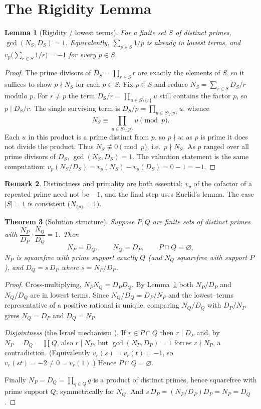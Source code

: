 \documentclass[11pt]{article}
\newtheorem{theorem}{Theorem}[section]
\newtheorem{lemma}[theorem]{Lemma}
\theoremstyle{definition}
\newtheorem{remark}[theorem]{Remark}
\begin{document}
\section{The Rigidity Lemma}\label{sec:rigidity}

\begin{lemma}[Rigidity / lowest terms]\label{thm:rigidity}
For a finite set $S$ of distinct primes, $\gcd(N_S,D_S)=1$. Equivalently, $\sum_{p\in S}1/p$ is
already in lowest terms, and $v_p\!\bigl(\sum_{r\in S}1/r\bigr)=-1$ for every $p\in S$.
\end{lemma}

\begin{proof}
The prime divisors of $D_S=\prod_{r\in S}r$ are exactly the elements of $S$, so it suffices to show
$p\nmid N_S$ for each $p\in S$. Fix $p\in S$ and reduce $N_S=\sum_{r\in S}D_S/r$ modulo $p$. For
$r\ne p$ the term $D_S/r=\prod_{u\in S\setminus\{r\}}u$ still contains the factor $p$, so
$p\mid D_S/r$. The single surviving term is $D_S/p=\prod_{u\in S\setminus\{p\}}u$, whence
\[
N_S \equiv \prod_{u\in S\setminus\{p\}} u \pmod p.
\]
Each $u$ in this product is a prime distinct from $p$, so $p\nmid u$; as $p$ is prime it does not
divide the product. Thus $N_S\not\equiv0\pmod p$, i.e.\ $p\nmid N_S$. As $p$ ranged over all prime
divisors of $D_S$, $\gcd(N_S,D_S)=1$. The valuation statement is the same computation:
$v_p(N_S/D_S)=v_p(N_S)-v_p(D_S)=0-1=-1$.
\end{proof}

\begin{remark}
Distinctness and primality are both essential: $v_p$ of the cofactor of a repeated prime need not be
$-1$, and the final step uses Euclid's lemma. The case $|S|=1$ is consistent ($N_{\{p\}}=1$).
\end{remark}

\begin{theorem}[Solution structure]\label{thm:structure}
Suppose $P,Q$ are finite sets of distinct primes with $\dfrac{N_P}{D_P}\cdot\dfrac{N_Q}{D_Q}=1$.
Then
\[
N_P=D_Q,\qquad N_Q=D_P,\qquad P\cap Q=\varnothing,
\]
$N_P$ is squarefree with prime support exactly $Q$ (and $N_Q$ squarefree with support $P$), and
$D_Q=s\,D_P$ where $s=N_P/D_P$.
\end{theorem}

\begin{proof}
Cross-multiplying, $N_PN_Q=D_PD_Q$. By Lemma~\ref{thm:rigidity} both $N_P/D_P$ and $N_Q/D_Q$ are in
lowest terms. Since $N_Q/D_Q=D_P/N_P$ and the lowest--terms representative of a positive rational is
unique, comparing $N_Q/D_Q$ with $D_P/N_P$ gives $N_Q=D_P$ and $D_Q=N_P$.

\emph{Disjointness} (the Israel mechanism \cite{MO320838}). If $r\in P\cap Q$ then $r\mid D_P$ and,
by $N_P=D_Q=\prod Q$, also $r\mid N_P$, but $\gcd(N_P,D_P)=1$ forces $r\nmid N_P$, a contradiction.
(Equivalently $v_r(s)=v_r(t)=-1$, so $v_r(st)=-2\neq0=v_r(1)$.) Hence $P\cap Q=\varnothing$.

Finally $N_P=D_Q=\prod_{q\in Q}q$ is a product of distinct primes, hence squarefree with prime
support $Q$; symmetrically for $N_Q$. And $s\,D_P=(N_P/D_P)D_P=N_P=D_Q$.
\end{proof}
\end{document}
